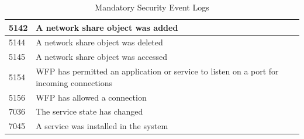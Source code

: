 \begin{table}[H]
\begin{tabular}{| p{1.5cm} | p{14.5cm} |}
        5142 & A network share object was added \\ \hline
        5144 & A network share object was deleted \\ \hline
        5145 & A network share object was accessed \\ \hline
        5154 & WFP has permitted an application or service to listen on a port for incoming connections \\ \hline
        5156 & WFP has allowed a connection \\ \hline
        7036\footnotemark[2] & The service state has changed \\ \hline
        7045\footnotemark[2] & A service was installed in the system \\ \hline
    \end{tabular}
    \caption{Mandatory Security Event Logs}
\end{table}
\setcounter{footnote}{3}
\clearpage

